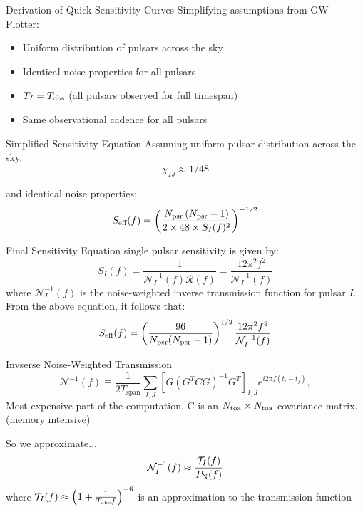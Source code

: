 \documentclass{beamer}
\begin{document}
\begin{frame}{Derivation of Quick Sensitivity Curves}
    Simplifying assumptions from GW Plotter:
    \begin{itemize}
        \item Uniform distribution of pulsars across the sky
        \item Identical noise properties for all pulsars
        \item $T_I = T_{\rm obs}$ (all pulsars observed for full timespan)
        \item Same observational cadence for all pulsars
    \end{itemize}
\end{frame}

\begin{frame}{Simplified Sensitivity Equation}
    Assuming uniform pulsar distribution across the sky,
    \[
    \chi_{IJ} \approx 1/48
    \]

    and identical noise properties:
    \[
    S_{\text{eff}}(f) = \left(\frac{N_{\rm psr}\left(N_{\rm psr}-1\right)}{2 \times 48 \times S_I(f)^2} \right)^{-1/2}
    \]
\end{frame}


\begin{frame}{Final Sensitivity Equation}
    single pulsar sensitivity is given by:
    \[
        S_{I}(f) = \frac{1}{\mathcal{N}_I^{-1}(f)\mathcal{R}(f)} = \frac{12\pi^2f^2}{\mathcal{N}_I^{-1}(f)}
        \]
        where $\mathcal{N}_I^{-1}(f)$ is the noise-weighted inverse transmission function for pulsar $I$.
    \pause
    From the above equation, it follows that:
    \[
    S_{\text{eff}}(f) = \left(\frac{96}{N_{\rm psr}(N_{\rm psr}-1)}\right)^{1/2} \frac{12\pi^2f^2}{\mathcal{N}^{-1}_I(f)}
    \]
\end{frame}

\begin{frame}{Invserse Noise-Weighted Transmission}
    \[
    \mathcal{N}^{-1}(f) \equiv \frac{1}{2 T_{\text{span}}} \sum_{I,J} \left[ G \left( G^T C G \right)^{-1} G^T \right]_{I,J} e^{i 2 \pi f \left(t_i - t_j\right)},
    \]
    Most expensive part of the computation. C is an $N_{\rm toa} \times N_{\rm toa}$ covariance matrix.
    (memory intensive)
    \pause
    \newline

    So we approximate...
    \[
    \mathcal{N}^{-1}_I(f) \approx \frac{\mathcal{T}_I(f)}{P_{\rm N}(f)}
    \]
    where $\mathcal{T}_I(f) \approx \left(1 + \frac{1}{T_{\rm obs}f}\right)^{-6}$ is an approximation to the transmission function
\end{frame}
\end{document}
